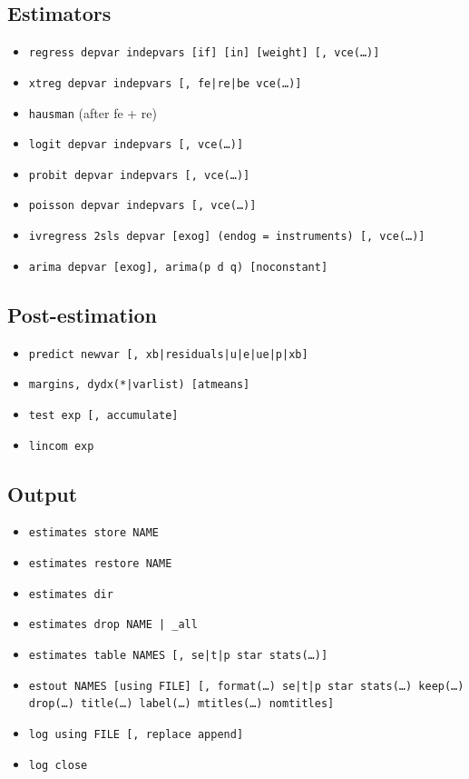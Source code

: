 \documentclass[11pt,letterpaper]{article}
\begin{document}
\subsection*{Estimators}
\begin{itemize}[leftmargin=*,itemsep=0pt]
\item \texttt{regress depvar indepvars [if] [in] [weight] [, vce(\ldots)]}
\item \texttt{xtreg depvar indepvars [, fe|re|be vce(\ldots)]}
\item \texttt{hausman} (after fe + re)
\item \texttt{logit depvar indepvars [, vce(\ldots)]}
\item \texttt{probit depvar indepvars [, vce(\ldots)]}
\item \texttt{poisson depvar indepvars [, vce(\ldots)]}
\item \texttt{ivregress 2sls depvar [exog] (endog = instruments) [, vce(\ldots)]}
\item \texttt{arima depvar [exog], arima(p d q) [noconstant]}
\end{itemize}

\subsection*{Post-estimation}
\begin{itemize}[leftmargin=*,itemsep=0pt]
\item \texttt{predict newvar [, xb|residuals|u|e|ue|p|xb]}
\item \texttt{margins, dydx(*|varlist) [atmeans]}
\item \texttt{test exp [, accumulate]}
\item \texttt{lincom exp}
\end{itemize}

\subsection*{Output}
\begin{itemize}[leftmargin=*,itemsep=0pt]
\item \texttt{estimates store NAME}
\item \texttt{estimates restore NAME}
\item \texttt{estimates dir}
\item \texttt{estimates drop NAME | \_all}
\item \texttt{estimates table NAMES [, se|t|p star stats(\ldots)]}
\item \texttt{estout NAMES [using FILE] [, format(\ldots) se|t|p star stats(\ldots) keep(\ldots) drop(\ldots) title(\ldots) label(\ldots) mtitles(\ldots) nomtitles]}
\item \texttt{log using FILE [, replace append]}
\item \texttt{log close}
\end{itemize}
\end{document}
